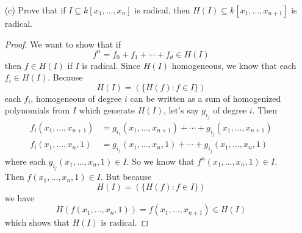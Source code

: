 \documentclass{article}
\begin{document}
\begin{itemize}
        \item [(c)] Prove that if $I \subseteq k[x_{1}, \ldots, x_{n}]$ is radical, then $H(I) \subseteq k[x_{1}, \ldots, x_{n + 1}]$ is radical. 
            \begin{proof}
                We want to show that if 
                    \begin{equation*}
                        f^{n} = f_{0} + f_{1} + \cdots + f_{d} \in H(I)
                    \end{equation*}
                then $f \in H(I)$ if $I$ is radical. Since $H(I)$ homogeneous, we know that each $f_{i} \in H(I)$. Because
                    \begin{equation*}
                        H(I) = (\{H(f) : f \in I\})
                    \end{equation*}
                each $f_{i}$, homogeneous of degree $i$ can be written as a sum of homogenized polynomials from $I$ which generate $H(I)$, let's say $g_{i_{j}}$ of degree $i$. Then
                    \begin{align*}
                        f_{i}(x_{1}, \ldots, x_{n + 1}) &= g_{i_{1}}(x_{1}, \ldots, x_{n + 1}) + \cdots + g_{i_{j}}(x_{1}, \ldots, x_{n + 1}) \\
                        f_{i}(x_{1}, \ldots, x_{n}, 1) &= g_{i_{1}}(x_{1}, \ldots, x_{n}, 1) + \cdots + g_{i_{j}}(x_{1}, \ldots, x_{n}, 1)
                    \end{align*}
                where each $g_{i_{j}}(x_{1}, \ldots, x_{n}, 1) \in I$. So we know that $f^{n}(x_{1}, \ldots, x_{n}, 1) \in I$. Then $f(x_{1}, \ldots, x_{n}, 1) \in I$. But because
                    \begin{equation*}
                        H(I) = (\{H(f) : f \in I\})
                    \end{equation*}
                we have
                    \begin{equation*}
                        H(f(x_{1}, \ldots, x_{n},1)) =  f(x_{1}, \ldots, x_{n + 1}) \in H(I)
                    \end{equation*}
                which shows that $H(I)$ is radical.
            \end{proof}
    \end{itemize}
\end{document}
